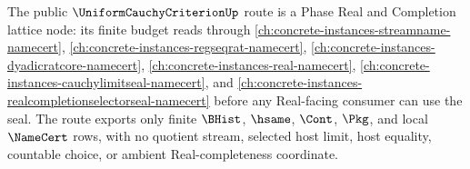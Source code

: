 The public $\UniformCauchyCriterionUp$ route is a Phase Real and Completion lattice node: its finite budget reads through \autoref{ch:concrete-instances-streamname-namecert}, \autoref{ch:concrete-instances-regseqrat-namecert}, \autoref{ch:concrete-instances-dyadicratcore-namecert}, \autoref{ch:concrete-instances-real-namecert}, \autoref{ch:concrete-instances-cauchylimitseal-namecert}, and \autoref{ch:concrete-instances-realcompletionselectorseal-namecert} before any Real-facing consumer can use the seal. The route exports only finite $\BHist$, $\hsame$, $\Cont$, $\Pkg$, and local $\NameCert$ rows, with no quotient stream, selected host limit, host equality, countable choice, or ambient Real-completeness coordinate.
